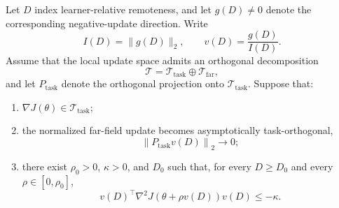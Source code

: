 \begin{lemma}
\label{lem:far_field_utility}
Let \(D\) index learner-relative remoteness, and let \(g(D)\neq0\)
denote the corresponding negative-update direction. Write
\begin{equation}
    I(D)
    =
    \|g(D)\|_2,
    \qquad
    v(D)
    =
    \frac{g(D)}{I(D)}.
    \label{eq:far_field_direction}
\end{equation}
Assume that the local update space admits an orthogonal decomposition
\begin{equation}
    \mathcal T
    =
    \mathcal T_{\mathrm{task}}
    \oplus
    \mathcal T_{\mathrm{far}},
    \label{eq:task_far_decomposition}
\end{equation}
and let \(P_{\mathrm{task}}\) denote the orthogonal projection onto
\(\mathcal T_{\mathrm{task}}\). Suppose that:
\begin{enumerate}
    \item \(\nabla J(\theta)\in\mathcal T_{\mathrm{task}}\);

    \item the normalized far-field update becomes asymptotically
    task-orthogonal,
    \begin{equation}
        \left\|
            P_{\mathrm{task}}v(D)
        \right\|_2
        \longrightarrow 0;
        \label{eq:task_projection_vanishes}
    \end{equation}

    \item there exist \(\rho_0>0\), \(\kappa>0\), and \(D_0\) such that,
    for every \(D\geq D_0\) and every \(\rho\in[0,\rho_0]\),
    \begin{equation}
        v(D)^\top
        \nabla^2J
        \!\left(
            \theta+\rho v(D)
        \right)
        v(D)
        \leq
        -\kappa.
        \label{eq:far_field_negative_curvature}
    \end{equation}
\end{enumerate}


\end{lemma}
